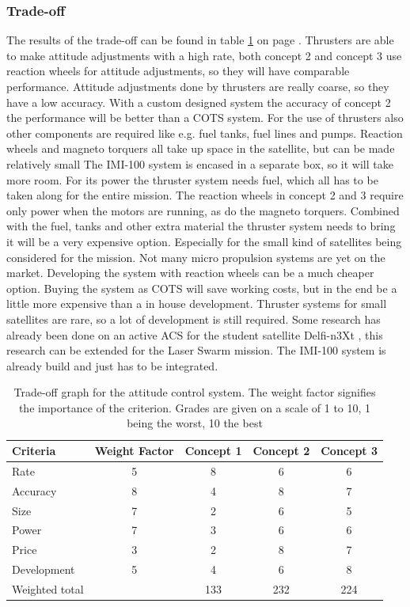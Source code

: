 \subsubsection{Trade-off}
The results of the trade-off can be found in table \ref{tab:acstradeoff} on page \pageref{tab:acstradeoff}.
Thrusters are able to make attitude adjustments with a high rate, both concept 2 and concept 3 use reaction wheels for attitude adjustments, so they will have comparable performance.
Attitude adjustments done by thrusters are really coarse, so they have a low accuracy. With a custom designed system the accuracy of concept 2 the performance will be better than a \ac{COTS} system.
For the use of thrusters also other components are required like e.g. fuel tanks, fuel lines and pumps. Reaction wheels and magneto torquers all take up space in the satellite, but can be made relatively small The IMI-100 system is encased in a separate box, so it will take more room.
For its power the thruster system needs fuel, which all has to be taken along for the entire mission. The reaction wheels in concept 2 and 3 require only power when the motors are running, as do the magneto torquers.
Combined with the fuel, tanks and other extra material the thruster system needs to bring it will be a very expensive option. Especially for the small kind of satellites being considered for the mission. Not many micro propulsion systems are yet on the market. Developing the system with reaction wheels can be a much cheaper option. Buying the system as \ac{COTS} will save working costs, but in the end be a little more expensive than a in house development.
Thruster systems for small satellites are rare, so a lot of development is still required. Some research has already been done on an active \ac{ACS} for the student satellite Delfi-n3Xt \cite{delfispace}, this research can be extended for the Laser Swarm mission. The IMI-100 system is already build and just has to be integrated. 

\begin{table} [h]
\centering
\begin{tabular}{p{3cm} | c | c c c}
\textbf{Criteria} & \textbf{Weight Factor} & \textbf{Concept 1} & \textbf{Concept 2} & \textbf{Concept 3} \\ \hline \hline
Rate 	    & 5 & 8 & 6 & 6 \\
Accuracy    & 8 & 4 & 8 & 7 \\
Size        & 7 & 2 & 6 & 5 \\
Power       & 7 & 3 & 6 & 6 \\
Price       & 3 & 2 & 8 & 7 \\
Development & 5 & 4 & 6 & 8 \\ \hline
Weighted total    &    & 133 & 232 & 224
\end{tabular} 
\caption[Trade-off attitude control]{Trade-off graph for the attitude control system. The weight factor signifies the importance of the criterion. Grades are given on a scale of 1 to 10, 1 being the worst, 10 the best}
\label{tab:acstradeoff}
\end{table}

